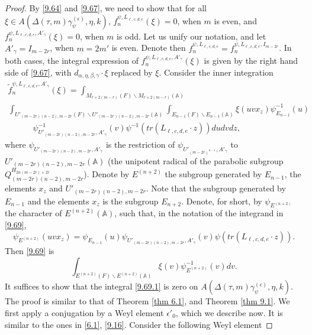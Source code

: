 \documentclass[12pts]{amsart}
\newcommand{\BA}{{\mathbb {A}}}
\begin{document}
\begin{proof}
By \eqref{9.64} and \eqref{9.67}, we need to show that for all $\xi\in A(\Delta(\tau,m)\gamma_\psi^{(\epsilon)},\eta,k)$, $f_n^{\psi,L_{\ell,c,d,e}}(\xi)=0$, when $m$ is even, and $f_n^{\psi,L_{\ell,c,d,e},A'_\gamma}(\xi)=0$, when $m$ is odd. Let us unify our notation, and let $A'_\gamma=I_{m-2r}$, when $m=2m'$ is even. Denote then $f_n^{\psi,L_{\ell,c,d,e}}=f_n^{\psi,L_{\ell,c,d,e},I_{m-2r}}$. In both cases, the integral expression of $f_n^{\psi,L_{\ell,c,d,e},A'_\gamma}(\xi)$ is given by the right hand side of \eqref{9.67}, with $d_{\alpha,\eta,\beta,\gamma}\cdot\xi$ replaced by $\xi$. Consider the inner integration
\begin{multline}\label{9.69}
\tilde{f}_n^{\psi,L_{\ell,c,d,e},A'_\gamma}(\xi)=\int_{M_{r\times 2(m-r)}(F)\backslash M_{r\times 2(m-r)}(\BA)}\\
\int_{U'_{(m-2r)(n-2),m-2r}(F)\backslash
	U'_{(m-2r)(n-2),m-2r}(\BA)}\int_{E_{n-1}(F)\backslash E_{n-1}(\BA)}\xi(uvx_z)\psi^{-1}_{E_{n-1}}(u)\\
\quad\quad\quad\psi^{-1}_{U'_{(m-2r)(n-2),m-2r},A'_\gamma}(v)\psi^{-1}(tr(L_{\ell,c,d,e}\cdot z))dudv dz,
\end{multline}
where $\psi_{U'_{(m-2r)(n-2),m-2r},A'_\gamma}$ is the restriction of $\psi_{U'_{(m-2r)^{n-1}},A'_\gamma}$ to\\ 
$U'_{(m-2r)(n-2),m-2r}(\BA)$ (the unipotent radical of the parabolic subgroup\\ $Q_{(m-2r)(n-2),m-2r}^{H_{2n(m-2r)+2r}}$).
Denote by $E^{(n+2)}$ the subgroup generated by $E_{n-1}$, the elements $x_z$ and $U'_{(m-2r)(n-2),m-2r}$. Note that the subgroup generated by $E_{n-1}$ and the elements $x_z$ is the subgroup $E_{n+2}$. Denote, for short, by $\psi_{E^{(n+2)}}$ the character of $E^{(n+2)}(\BA)$, such that, in the notation of the integrand in \eqref{9.69},
$$
\psi_{E^{(n+2)}}(uvx_z)=\psi_{E_{n-1}}(u)\psi_{U'_{(m-2r)(n-2),m-2r},A'_\gamma}(v)\psi(tr(L_{\ell,c,d,e}\cdot z)).
$$
Then \eqref{9.69} is
\begin{equation}\label{9.69.1}
\int_{E^{(n+2)}(F)\backslash E^{(n+2)}(\BA)}\xi(v)\psi^{-1}_{E^{(n+2)}}(v)dv.
\end{equation}
It suffices to show that the integral \eqref{9.69.1} is zero on $A(\Delta(\tau,m)\gamma_\psi^{(\epsilon)},\eta,k)$.  The proof is similar to that of Theorem \ref{thm 6.1}, and Theorem \ref{thm 9.1}. We first apply a conjugation by a Weyl element $\epsilon'_0$, which we describe now. It is similar to the ones in \eqref{6.1}, \eqref{9.16}.
Consider the following Weyl element	

\end{proof}
\end{document}
